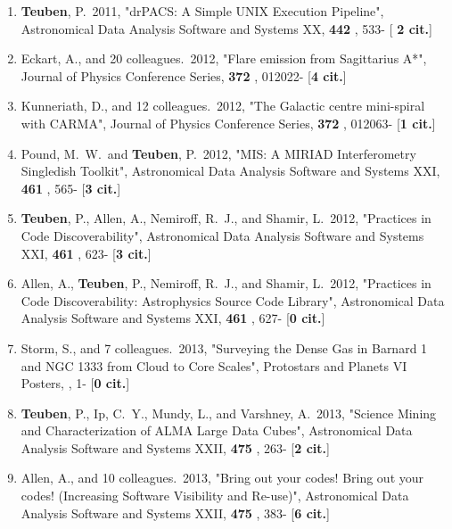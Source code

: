 \documentclass[11pt,letterpaper]{article}
\begin{document}
\begin{enumerate}[resume,label=\textbf{\arabic*}.]
\item  
{\bf Teuben}, P.\  2011,  "drPACS: A Simple UNIX Execution Pipeline", 
Astronomical Data Analysis Software and Systems XX,  {\bf 442} , 533- [{\bf 
2 cit.}] 



\item  
Eckart, A., and 20 colleagues.\  2012,  "Flare emission from Sagittarius 
A*", Journal of Physics Conference Series,  {\bf 372} , 012022- [{\bf 4 
cit.}] 

\item  
Kunneriath, D., and 12 colleagues.\  2012,  "The Galactic centre 
mini-spiral with CARMA", Journal of Physics Conference Series,  {\bf 372} , 
012063- [{\bf 1 cit.}] 


\item  
Pound, M.~W.~and {\bf Teuben}, P.\  2012,  "MIS: A MIRIAD Interferometry 
Singledish Toolkit", Astronomical Data Analysis Software and Systems XXI,  
{\bf 461} , 565- [{\bf 3 cit.}] 

\item  
{\bf Teuben}, P., Allen, A., Nemiroff, R.~J., and Shamir, L.\  2012,  "Practices 
in Code Discoverability", Astronomical Data Analysis Software and Systems 
XXI,  {\bf 461} , 623- [{\bf 3 cit.}] 

\item  
Allen, A., {\bf Teuben}, P., Nemiroff, R.~J., and Shamir, L.\  2012,  "Practices 
in Code Discoverability: Astrophysics Source Code Library", Astronomical 
Data Analysis Software and Systems XXI,  {\bf 461} , 627- [{\bf 0 cit.}] 



\item  
Storm, S., and 7 colleagues.\  2013,  "Surveying the Dense Gas in Barnard 1 
and NGC 1333 from Cloud to Core Scales", Protostars and Planets VI Posters,  
, 1- [{\bf 0 cit.}] 

\item  
{\bf Teuben}, P., Ip, C.~Y., Mundy, L., and Varshney, A.\  2013,  "Science 
Mining and Characterization of ALMA Large Data Cubes", Astronomical Data 
Analysis Software and Systems XXII,  {\bf 475} , 263- [{\bf 2 cit.}] 

\item  
Allen, A., and 10 colleagues.\  2013,  "Bring out your codes! Bring out 
your codes! (Increasing Software Visibility and Re-use)", Astronomical Data 
Analysis Software and Systems XXII,  {\bf 475} , 383- [{\bf 6 cit.}] 


\end{enumerate}
\end{document}
